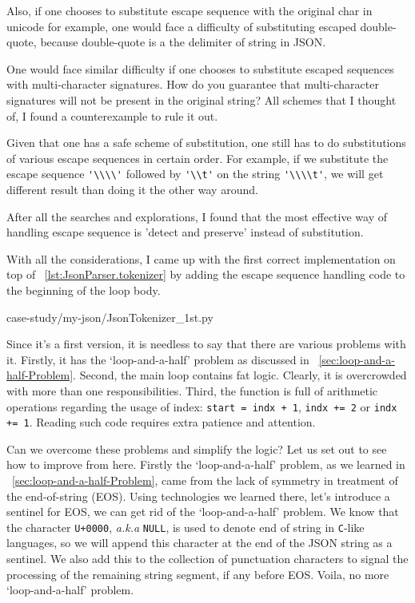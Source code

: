\documentclass[oneside,11pt]{book}
\makeatletter
\let\LaTeXAtSign=\@
\let\@=\relax
\let\@=\LaTeXAtSign
\theoremstyle{definition}
\theoremstyle{remark}
\newcommand{\code}[1]{\mbox{\lstinline{#1}}}
\makeatother
\begin{document}
Also, if one chooses to substitute escape sequence with the original char in unicode for example,
one would face a difficulty of substituting escaped double-quote,
because double-quote is a the delimiter of string in JSON\@.

One would face similar difficulty if one chooses to substitute escaped sequences with
multi-character signatures.
How do you guarantee that multi-character signatures will not be present in the original string?
All schemes that I thought of, I found a counterexample to rule it out.

Given that one has a safe scheme of substitution, one still has to do substitutions of
various escape sequences in certain order.
For example, if we substitute the escape sequence \code{'\\\\'}
followed by \code{'\\t'} on the string \code{'\\\\t'},
we will get different result than doing it the other way around.

After all the searches and explorations, I found that
the most effective way of handling escape sequence is 'detect and preserve'
instead of substitution.

With all the considerations, I came up with the first correct implementation on top of
~\autoref{lst:JsonParser.tokenizer} by adding the escape sequence handling code to the beginning of
the loop body.

{case-study/my-json/JsonTokenizer_1st.py}

Since it's a first version, it is needless to say that there are various problems with it.
Firstly, it has the `loop-and-a-half' problem as discussed in
~\autoref{sec:loop-and-a-half-Problem}.
Second, the main loop contains fat logic.
Clearly, it is overcrowded with more than one responsibilities.
Third, the function is full of arithmetic operations regarding the usage of index:
\code{start = indx + 1}, \code{indx += 2} or \code{indx += 1}.
Reading such code requires extra patience and attention.

Can we overcome these problems and simplify the logic?
Let us set out to see how to improve from here.
Firstly the `loop-and-a-half' problem, as we learned in ~\autoref{sec:loop-and-a-half-Problem},
came from the lack of symmetry in treatment of the end-of-string (EOS).
Using technologies we learned there, let's introduce a sentinel for EOS,
we can get rid of the `loop-and-a-half' problem.
We know that the character \code{U+0000}, \textit{a.k.a} \code{NULL},
is used to denote end of string in \code{C}-like languages,
so we will append this character at the end of the JSON string as a sentinel.
We also add this to the collection of punctuation characters to signal the processing of the
remaining string segment, if any before EOS\@.
Voila, no more `loop-and-a-half' problem.
\end{document}
